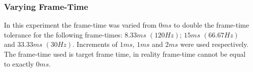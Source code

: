 %
%

\subsubsection{Varying Frame-Time}

In this experiment the frame-time was varied from $0ms$ to double the frame-time tolerance for the following frame-times: $8.33ms$ $(120Hz)$; $15ms$ $(66.67Hz)$ and $33.33ms$ $(30Hz)$. Increments of $1ms$, $1ms$ and $2ms$ were used respectively. The frame-time used is target frame time, in reality frame-time cannot be equal to exactly $0ms$.

